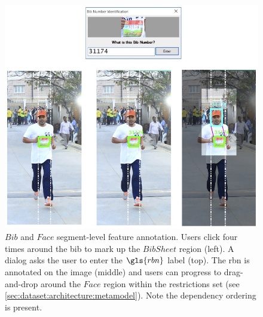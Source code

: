 \begin{figure}
  \centering
  \includegraphics[width=\textwidth]{images/dataset/argus/argus_entry}
  \caption[Bib and Face feature annotation with Argus]{$Bib$ and $Face$ segment-level feature annotation. Users click four times around the bib to mark up the $BibSheet$ region (left). A dialog asks the user to enter the $\gls{rbn}$ label (top). The \gls{rbn} is annotated on the image (middle) and users can progress to drag-and-drop around the $Face$ region within the restrictions set (see \cref{sec:dataset:architecture:metamodel}). Note the dependency ordering is present.}
  \label{fig:dataset:argus:bib_and_face}
\end{figure}

